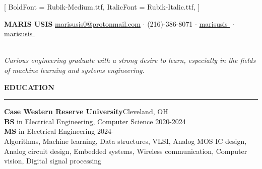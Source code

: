 \documentclass[notitlepage,10pt,a4paper]{article}
\newcommand{\linka}[2]{
   \textcolor{linkb}{\href{#1}{#2}}
}
\newenvironment{resumesection}[1]{
    \header{#1}
}{}
\newcommand{\header}[1]{
    \vspace{2pt}
    \textcolor{accent1}{\Large \textbf{#1}}
    \vspace{6pt}\hrule\vspace{4pt}
}
\newcommand{\thingsep}{
    \vspace{4pt}
}
\begin{document}
\setmainfont{Rubik-Regular.ttf}[
    BoldFont = Rubik-Medium.ttf,
    ItalicFont = Rubik-Italic.ttf,
]

\setlength{\parindent}{0pt}

\textcolor{accent1}{\huge \textbf{MARIS USIS}} \hfill\linka{mailto:marisusis0@protonmail.com}{marisusis0@protonmail.com} $\cdot$ (216)-386-8071 $\cdot$ \linka{https://linkedin.com/in/marisusis}{marisusis\,\,\faLinkedinSquare} $\cdot$ \linka{https://github.com/marisusis}{marisusis\,\,\faGithub}
\thingsep \\
\textit{Curious engineering graduate with a strong desire to learn, especially in the fields of machine learning and systems engineering.}
\thingsep

\begin{resumesection}{EDUCATION}
    \textcolor{accent2}{\textbf{\large Case Western Reserve University}}\hfill Cleveland, OH\\
    \textbf{BS} in Electrical Engineering, Computer Science \hfill 2020-2024\\
    \textbf{MS} in Electrical Engineering  \hfill 2024-\\
    {\small Algorithms, Machine learning, Data structures, VLSI, Analog MOS IC design, Analog circuit design, Embedded systems, Wireless communication, Computer vision, Digital signal processing}
    \thingsep

\end{resumesection}
\end{document}

